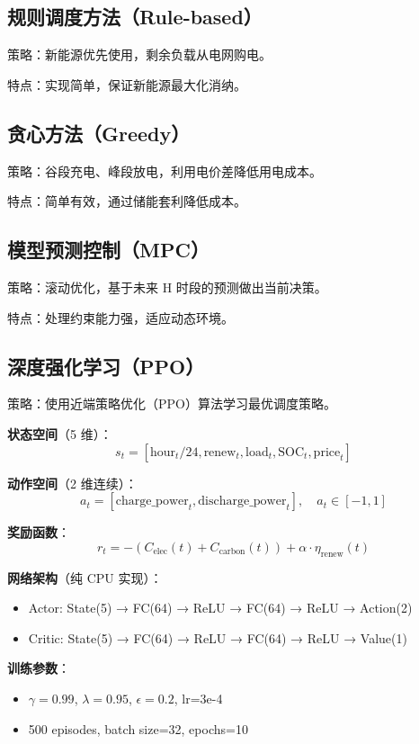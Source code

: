 \documentclass[12pt,a4paper]{article}
\begin{document}
\subsection{规则调度方法（Rule-based）}

策略：新能源优先使用，剩余负载从电网购电。

特点：实现简单，保证新能源最大化消纳。

\subsection{贪心方法（Greedy）}

策略：谷段充电、峰段放电，利用电价差降低用电成本。

特点：简单有效，通过储能套利降低成本。

\subsection{模型预测控制（MPC）}

策略：滚动优化，基于未来 H 时段的预测做出当前决策。

特点：处理约束能力强，适应动态环境。

\subsection{深度强化学习（PPO）}

策略：使用近端策略优化（PPO）算法学习最优调度策略。

\textbf{状态空间}（5 维）：
$$s_t = [\text{hour}_t/24, \text{renew}_t, \text{load}_t, \text{SOC}_t, \text{price}_t]$$

\textbf{动作空间}（2 维连续）：
$$a_t = [\text{charge\_power}_t, \text{discharge\_power}_t], \quad a_t \in [-1, 1]$$

\textbf{奖励函数}：
$$r_t = -(C_{\text{elec}}(t) + C_{\text{carbon}}(t)) + \alpha \cdot \eta_{\text{renew}}(t)$$

\textbf{网络架构}（纯 CPU 实现）：
\begin{itemize}
    \item Actor: State(5) → FC(64) → ReLU → FC(64) → ReLU → Action(2)
    \item Critic: State(5) → FC(64) → ReLU → FC(64) → ReLU → Value(1)
\end{itemize}

\textbf{训练参数}：
\begin{itemize}
    \item $\gamma=0.99$, $\lambda=0.95$, $\epsilon=0.2$, lr=3e-4
    \item 500 episodes, batch size=32, epochs=10
\end{itemize}
\end{document}
